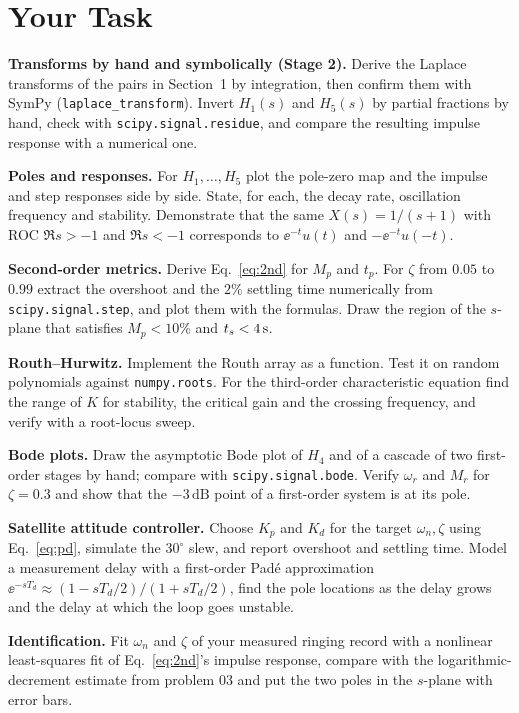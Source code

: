 \documentclass[11pt,a4paper]{article}
\begin{document}
\section*{Your Task}
\begin{tasks}
  \item \textbf{Transforms by hand and symbolically (Stage 2).} Derive the Laplace transforms of the pairs in Section~1 by integration, then confirm them with SymPy (\texttt{laplace\_transform}). Invert $H_1(s)$ and $H_5(s)$ by partial fractions by hand, check with \texttt{scipy.signal.residue}, and compare the resulting impulse response with a numerical one.
  \item \textbf{Poles and responses.} For $H_1,\dots,H_5$ plot the pole-zero map and the impulse and step responses side by side. State, for each, the decay rate, oscillation frequency and stability. Demonstrate that the same $X(s)=1/(s+1)$ with ROC $\Re s>-1$ and $\Re s<-1$ corresponds to $\ee^{-t}u(t)$ and $-\ee^{-t}u(-t)$.
  \item \textbf{Second-order metrics.} Derive Eq.~\eqref{eq:2nd} for $M_p$ and $t_p$. For $\zeta$ from $0.05$ to $0.99$ extract the overshoot and the $2\%$ settling time numerically from \texttt{scipy.signal.step}, and plot them with the formulas. Draw the region of the $s$-plane that satisfies $M_p<10\%$ and $t_s<\SI{4}{\second}$.
  \item \textbf{Routh--Hurwitz.} Implement the Routh array as a function. Test it on random polynomials against \texttt{numpy.roots}. For the third-order characteristic equation find the range of $K$ for stability, the critical gain and the crossing frequency, and verify with a root-locus sweep.
  \item \textbf{Bode plots.} Draw the asymptotic Bode plot of $H_4$ and of a cascade of two first-order stages by hand; compare with \texttt{scipy.signal.bode}. Verify $\omega_r$ and $M_r$ for $\zeta=0.3$ and show that the $-3\,\mathrm{dB}$ point of a first-order system is at its pole.
  \item \textbf{Satellite attitude controller.} Choose $K_p$ and $K_d$ for the target $\omega_n,\zeta$ using Eq.~\eqref{eq:pd}, simulate the $30^\circ$ slew, and report overshoot and settling time. Model a measurement delay with a first-order Pad\'e approximation $\ee^{-sT_d}\approx(1-sT_d/2)/(1+sT_d/2)$, find the pole locations as the delay grows and the delay at which the loop goes unstable.
  \item \textbf{Identification.} Fit $\omega_n$ and $\zeta$ of your measured ringing record with a nonlinear least-squares fit of Eq.~\eqref{eq:2nd}'s impulse response, compare with the logarithmic-decrement estimate from problem 03 and put the two poles in the $s$-plane with error bars.
\end{tasks}
\end{document}
